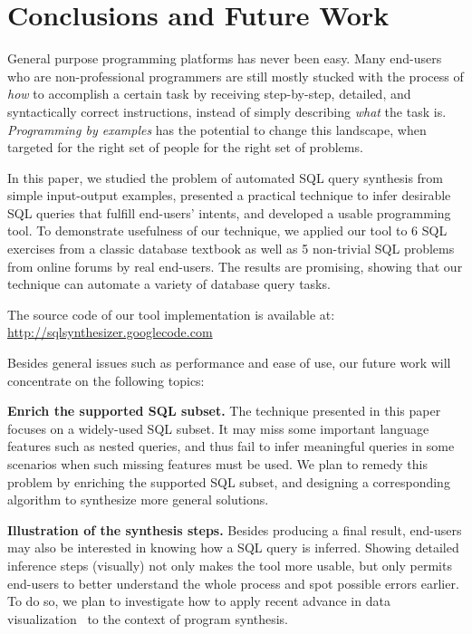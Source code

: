 \section{Conclusions and Future Work}
\label{sec:conclusion}

General purpose programming platforms has never been easy. Many end-users
who are non-professional programmers are still mostly stucked with the process
of \textit{how} to accomplish a certain task by receiving 
step-by-step, detailed, and syntactically correct instructions, instead of simply describing
\textit{what} the task is. \textit{Programming by examples} has the potential
to change this landscape, when targeted for the right set of people for the
right set of problems.

In this paper, we studied the problem of automated SQL query synthesis
from simple input-output examples, presented a practical technique to 
infer desirable SQL queries that fulfill end-users' intents, and
developed a usable programming tool.
To demonstrate usefulness of our technique, we applied our tool
to 6 SQL exercises from a classic database textbook as well as
5 non-trivial SQL problems from online forums by real end-users. 
The results are promising, showing that our technique can automate a variety of database
query tasks.

The source code of our tool implementation is available at: \\
\url{http://sqlsynthesizer.googlecode.com}

\vspace{1mm}

Besides general issues such as performance and ease of use, our future
work will concentrate on the following topics:

\textbf{Enrich the supported SQL subset.} The technique 
presented in this paper focuses on a widely-used SQL subset.
It may miss some important language features such as
nested queries, and thus fail to infer meaningful queries
in some scenarios when such missing features must be used.
We plan to remedy this problem by enriching the
supported SQL subset, and designing a corresponding algorithm
to synthesize more general solutions.

\textbf{Illustration of the synthesis steps.} Besides
producing a final result, end-users may also be interested in knowing
how a SQL query is inferred.  Showing detailed inference steps (visually) not
only makes the tool more usable, but only permits
end-users to better understand the whole process and spot possible errors earlier.
To do so, we plan to investigate how to apply recent advance in data
visualization~\cite{Kandel:2011}
to the context of program synthesis.

